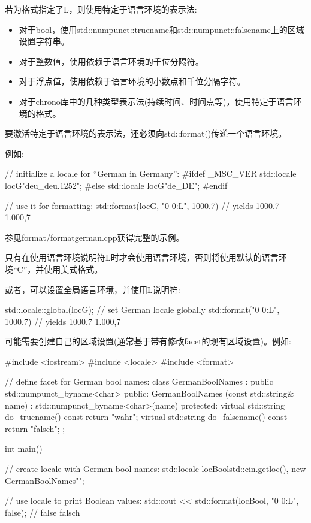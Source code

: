 若为格式指定了L，则使用特定于语言环境的表示法:

\begin{itemize}
\item
对于bool，使用std::numpunct::truename和std::numpunct::falsename上的区域设置字符串。

\item
对于整数值，使用依赖于语言环境的千位分隔符。

\item
对于浮点值，使用依赖于语言环境的小数点和千位分隔字符。

\item
对于chrono库中的几种类型表示法(持续时间、时间点等)，使用特定于语言环境的格式。
\end{itemize}

要激活特定于语言环境的表示法，还必须向std::format()传递一个语言环境。

例如:

\begin{cpp}
// initialize a locale for “German in Germany”:
#ifdef _MSC_VER
std::locale locG{"deu_deu.1252"};
#else
std::locale locG{"de_DE"};
#endif

// use it for formatting:
std::format(locG, "{0} {0:L}", 1000.7) // yields 1000.7 1.000,7
\end{cpp}

参见format/formatgerman.cpp获得完整的示例。

只有在使用语言环境说明符L时才会使用语言环境，否则将使用默认的语言环境“C”，并使用美式格式。

或者，可以设置全局语言环境，并使用L说明符:

\begin{cpp}
std::locale::global(locG); // set German locale globally
std::format("{0} {0:L}", 1000.7) // yields 1000.7 1.000,7
\end{cpp}

可能需要创建自己的区域设置(通常基于带有修改facet的现有区域设置)。例如:


\begin{cpp}
#include <iostream>
#include <locale>
#include <format>

// define facet for German bool names:
class GermanBoolNames : public std::numpunct_byname<char> {
	public:
	GermanBoolNames (const std::string& name)
	: std::numpunct_byname<char>(name) {
	}
	protected:
	virtual std::string do_truename() const {
		return "wahr";
	}
	virtual std::string do_falsename() const {
		return "falsch";
	}
};

int main()
{
	// create locale with German bool names:
	std::locale locBool{std::cin.getloc(),
						new GermanBoolNames{""}};

	// use locale to print Boolean values:
	std::cout << std::format(locBool, "{0} {0:L}\n", false); // false falsch
}
\end{cpp}

